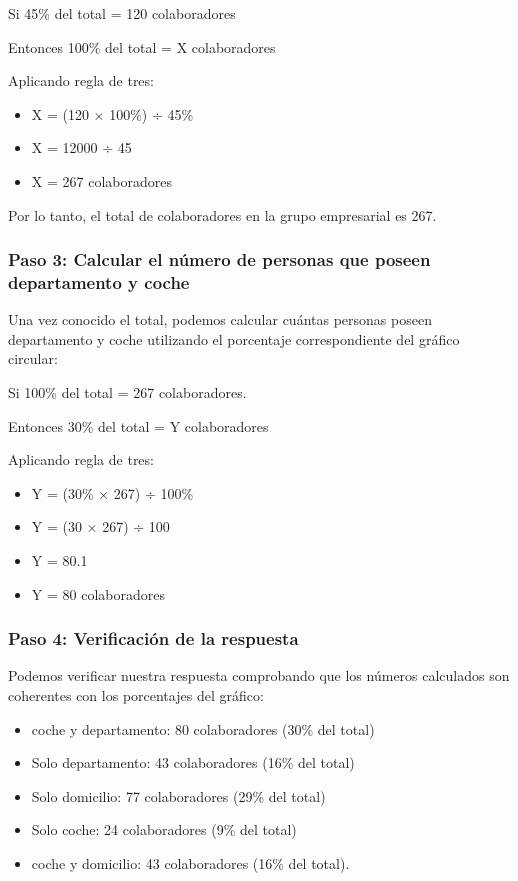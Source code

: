 \documentclass[
]{article}
\providecommand{\tightlist}{%
  \setlength{\itemsep}{0pt}\setlength{\parskip}{0pt}}
\begin{document}
Si 45\% del total = 120 colaboradores

Entonces 100\% del total = X colaboradores

Aplicando regla de tres:

\begin{itemize}
\tightlist
\item
  X = (120 × 100\%) ÷ 45\%
\item
  X = 12000 ÷ 45
\item
  X = 267 colaboradores
\end{itemize}

Por lo tanto, el total de colaboradores en la grupo empresarial es 267.

\subsubsection{Paso 3: Calcular el número de personas que poseen
departamento y
coche}\label{paso-3-calcular-el-nuxfamero-de-personas-que-poseen-departamento-y-coche}

Una vez conocido el total, podemos calcular cuántas personas poseen
departamento y coche utilizando el porcentaje correspondiente del
gráfico circular:

Si 100\% del total = 267 colaboradores.

Entonces 30\% del total = Y colaboradores

Aplicando regla de tres:

\begin{itemize}
\tightlist
\item
  Y = (30\% × 267) ÷ 100\%
\item
  Y = (30 × 267) ÷ 100
\item
  Y = 80.1
\item
  Y = 80 colaboradores
\end{itemize}

\subsubsection{Paso 4: Verificación de la
respuesta}\label{paso-4-verificaciuxf3n-de-la-respuesta}

Podemos verificar nuestra respuesta comprobando que los números
calculados son coherentes con los porcentajes del gráfico:

\begin{itemize}
\tightlist
\item
  coche y departamento: 80 colaboradores (30\% del total)
\item
  Solo departamento: 43 colaboradores (16\% del total)
\item
  Solo domicilio: 77 colaboradores (29\% del total)
\item
  Solo coche: 24 colaboradores (9\% del total)
\item
  coche y domicilio: 43 colaboradores (16\% del total).
\end{itemize}
\end{document}
